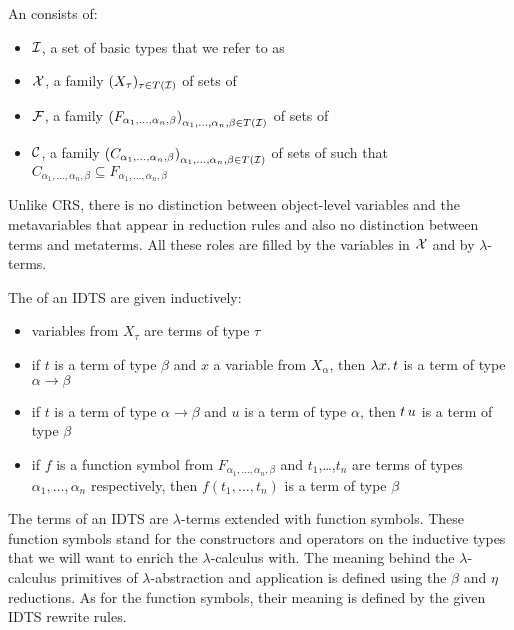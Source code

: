 \begin{definition}
  An  consists of:
  \begin{itemize}
  \item $\mathcal{I}$, a set of basic types that we refer to as 
  \item $\mathcal{X}$, a family $(X_\tau)_{\tau \in T(\mathcal{I})}$ of sets of 
  \item $\mathcal{F}$, a family ${(F_{\alpha_1,\ldots,\alpha_n,\beta})}_{\alpha_1,\ldots,\alpha_n,\beta \in T(\mathcal{I})}$ of sets of 
  \item $\mathcal{C}$, a family ${(C_{\alpha_1,\ldots,\alpha_n,\beta})}_{\alpha_1,\ldots,\alpha_n,\beta \in T(\mathcal{I})}$ of sets of 
    such that $C_{\alpha_1,\ldots,\alpha_n,\beta} \subseteq F_{\alpha_1,\ldots,\alpha_n,\beta}$
  \end{itemize}
\end{definition}

Unlike CRS, there is no distinction between object-level variables and the
metavariables that appear in reduction rules and also no distinction
between terms and metaterms. All these roles are filled by the variables in
$\mathcal{X}$ and by $\lambda$-terms.

\begin{definition}
  The  of an IDTS are given inductively:
  \begin{itemize}
  \item variables from $X_\tau$ are terms of type $\tau$
  \item if $t$ is a term of type $\beta$ and $x$ a variable from
    $X_\alpha$, then $\lambda x.\, t$ is a term of type $\alpha \to \beta$
  \item if $t$ is a term of type $\alpha \to \beta$ and $u$ is a term of
    type $\alpha$, then $t\,u$ is a term of type $\beta$
  \item if $f$ is a function symbol from
    $F_{\alpha_1,\ldots,\alpha_n,\beta}$ and $t_1$,\ldots,$t_n$ are terms
    of types $\alpha_1,\ldots,\alpha_n$ respectively, then
    $f(t_1,\ldots,t_n)$ is a term of type $\beta$
  \end{itemize}
\end{definition}

The terms of an IDTS are $\lambda$-terms extended with function
symbols. These function symbols stand for the constructors and operators on
the inductive types that we will want to enrich the $\lambda$-calculus
with. The meaning behind the $\lambda$-calculus primitives of
$\lambda$-abstraction and application is defined using the $\beta$ and
$\eta$ reductions. As for the function symbols, their meaning is defined by
the given IDTS rewrite rules.

